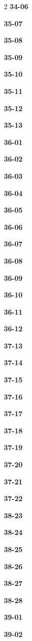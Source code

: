 \documentclass[10pt,a4paper]{article}
\begin{document}
\begin{multicols}{2}
\noindent\textbf{34-06}\ \par
\noindent\textbf{35-07}\ \par
\noindent\textbf{35-08}\ \par
\noindent\textbf{35-09}\ \par
\noindent\textbf{35-10}\ \par
\noindent\textbf{35-11}\ \par
\noindent\textbf{35-12}\ \par
\noindent\textbf{35-13}\ \par
\noindent\textbf{36-01}\ \par
\noindent\textbf{36-02}\ \par
\noindent\textbf{36-03}\ \par
\noindent\textbf{36-04}\ \par
\noindent\textbf{36-05}\ \par
\noindent\textbf{36-06}\ \par
\noindent\textbf{36-07}\ \par
\noindent\textbf{36-08}\ \par
\noindent\textbf{36-09}\ \par
\noindent\textbf{36-10}\ \par
\noindent\textbf{36-11}\ \par
\noindent\textbf{36-12}\ \par
\noindent\textbf{37-13}\ \par
\noindent\textbf{37-14}\ \par
\noindent\textbf{37-15}\ \par
\noindent\textbf{37-16}\ \par
\noindent\textbf{37-17}\ \par
\noindent\textbf{37-18}\ \par
\noindent\textbf{37-19}\ \par
\noindent\textbf{37-20}\ \par
\noindent\textbf{37-21}\ \par
\noindent\textbf{37-22}\ \par
\noindent\textbf{38-23}\ \par
\noindent\textbf{38-24}\ \par
\noindent\textbf{38-25}\ \par
\noindent\textbf{38-26}\ \par
\noindent\textbf{38-27}\ \par
\noindent\textbf{38-28}\ \par
\noindent\textbf{39-01}\ \par
\noindent\textbf{39-02}\ \par

\end{multicols}
\end{document}
